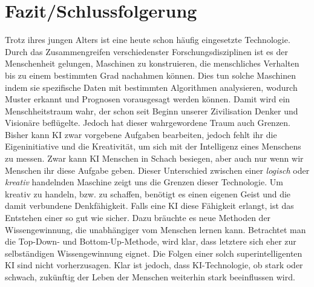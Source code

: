 \documentclass[12pt,german,ngerman]{report}
\begin{document}
%
%            

\chapter{Fazit/Schlussfolgerung}
    Trotz ihres jungen Alters ist  eine heute schon häufig eingesetzte Technologie.
    Durch das Zusammengreifen verschiedenster Forschungsdisziplinen ist es der Menschenheit gelungen,
    Maschinen zu konstruieren, die menschliches Verhalten bis zu einem bestimmten Grad nachahmen können.
    Dies tun solche Maschinen indem sie spezifische Daten mit bestimmten Algorithmen analysieren, wodurch Muster erkannt und Prognosen vorausgesagt werden können.
    Damit wird ein Menschheitstraum wahr, der schon seit Beginn unserer Zivilisation Denker und Visionäre beflügelte.
    Jedoch hat dieser wahrgewordene Traum auch Grenzen. Bisher kann KI zwar vorgebene Aufgaben bearbeiten,
    jedoch fehlt ihr die Eigeninitiative und die Kreativität, um sich mit der Intelligenz eines Menschens zu messen.
    Zwar kann KI Menschen in Schach besiegen, aber auch nur wenn wir Menschen ihr diese Aufgabe geben.
    Dieser Unterschied zwischen einer \emph{logisch} oder \emph{kreativ} handelnden Maschine
    zeigt uns die Grenzen dieser Technologie.
    Um kreativ zu handeln, bzw. zu schaffen, benötigt es einen eigenen Geist und die damit verbundene Denkfähigkeit.
    Falls eine KI diese Fähigkeit erlangt, ist das Entstehen einer  so gut wie sicher.
    Dazu bräuchte es neue Methoden der Wissengewinnung, die unabhängiger vom Menschen lernen kann.
    Betrachtet man die Top-Down- und Bottom-Up-Methode, wird klar, dass letztere sich eher zur selbständigen Wissengewinnung eignet.
    Die Folgen einer solch superintelligenten KI sind nicht vorherzusagen.
    Klar ist jedoch, dass KI-Technologie, ob stark oder schwach, zukünftig der Leben der Menschen weiterhin stark beeinflussen wird.

    \printbibliography[title={Quellenverzeichnis}]
\end{document}
